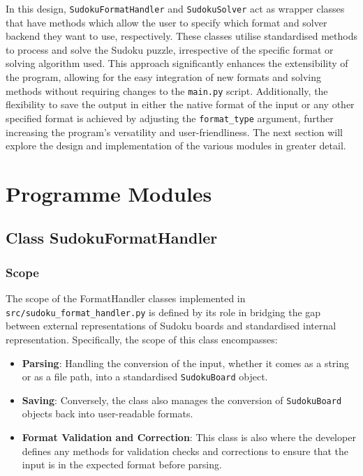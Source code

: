 \documentclass[11pt]{article}
\begin{document}
In this design, \texttt{SudokuFormatHandler} and \texttt{SudokuSolver} act as wrapper classes that have methods which allow the user to specify which format and solver backend they want to use, respectively. These classes utilise standardised methods to process and solve the Sudoku puzzle, irrespective of the specific format or solving algorithm used. This approach significantly enhances the extensibility of the program, allowing for the easy integration of new formats and solving methods without requiring changes to the \texttt{main.py} script. Additionally, the flexibility to save the output in either the native format of the input or any other specified format is achieved by adjusting the \texttt{format\_type} argument, further increasing the program's versatility and user-friendliness. The next section will explore the design and implementation of the various modules in greater detail.

\section{Programme Modules}
\subsection{Class SudokuFormatHandler}

\subsubsection{Scope}
The scope of the FormatHandler classes implemented in \texttt{src/sudoku\_format\_handler.py} is defined by its role in bridging the gap between external representations of Sudoku boards and standardised internal representation. Specifically, the scope of this class encompasses:

\begin{itemize}
\item \textbf{Parsing}: Handling the conversion of the input, whether it comes as a string or as a file path, into a standardised \texttt{SudokuBoard} object.

\item \textbf{Saving}: Conversely, the class also manages the conversion of \texttt{SudokuBoard} objects back into user-readable formats. 

\item \textbf{Format Validation and Correction}: This class is also where the developer defines any methods for validation checks and corrections to ensure that the input is in the expected format before parsing.
\end{itemize}
\end{document}
